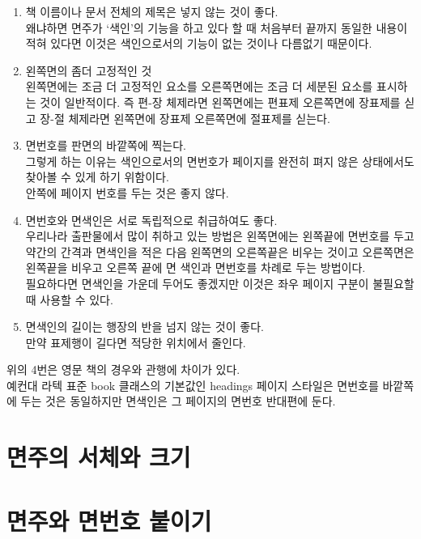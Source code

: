 \documentclass[12pt, a4paper, oneside]{book}
\let\stdsection\section
\renewcommand\section{\newpage\stdsection}
\begin{document}
			\begin{enumerate}
			\item 	책 이름이나 문서 전체의 제목은 넣지 않는 것이 좋다. \\
					왜냐하면 면주가 ‘색인’의 기능을 하고 있다 할 때 처음부터 끝까지 
					동일한 내용이 적혀 있다면 이것은 색인으로서의 기능이 없는 것이나 다름없기 때문이다.
			\item 	왼쪽면의 좀더 고정적인 것 \\
					왼쪽면에는 조금 더 고정적인 요소를 
					오른쪽면에는 조금 더 세분된 요소를 표시하는 것이 일반적이다. 
					즉 편-장 체제라면 왼쪽면에는 편표제 오른쪽면에 장표제를 싣고 
					장-절 체제라면 왼쪽면에 장표제 오른쪽면에 절표제를 싣는다.
			\item 	면번호를 판면의 바깥쪽에 찍는다. \\
					그렇게 하는 이유는 색인으로서의 면번호가 페이지를 완전히 펴지 않은 상태에서도 
					찾아볼 수 있게 하기 위함이다. \\
					안쪽에 페이지 번호를 두는 것은 좋지 않다.
			\item 	면번호와 면색인은 서로 독립적으로 취급하여도 좋다. \\
					우리나라 출판물에서 많이 취하고 있는 방법은 왼쪽면에는 왼쪽끝에 면번호를 두고 
					약간의 간격과 면색인을 적은 다음 왼쪽면의 오른쪽끝은 비우는 것이고 
					오른쪽면은 왼쪽끝을 비우고 오른쪽 끝에 면 색인과 면번호를 차례로 두는 방법이다. \\
					필요하다면 면색인을 가운데 두어도 좋겠지만 
					이것은 좌우 페이지 구분이 불필요할 때 사용할 수 있다.
			\item 	면색인의 길이는 행장의 반을 넘지 않는 것이 좋다. \\
					만약 표제행이 길다면 적당한 위치에서 줄인다.
			\end{enumerate}
	
					위의 4번은 영문 책의 경우와 관행에 차이가 있다. \\
					예컨대 라텍 표준 book 클래스의 기본값인 headings 페이지 스타일은 
					면번호를 바깥쪽에 두는 것은 동일하지만 면색인은 그 페이지의 면번호 반대편에 둔다.
	
	\newpage  \null
	\section{면주의 서체와 크기}
	
	
	\newpage  \null
	\section{면주와 면번호 붙이기}
\end{document}
